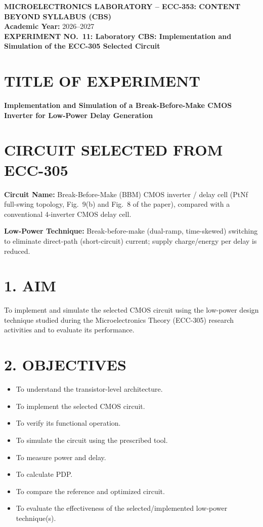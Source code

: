 \documentclass[11pt,a4paper]{article}
\newcommand{\sect}[1]{\section*{#1}}
\begin{document}
\collegeheader

\begin{center}
  {\bfseries MICROELECTRONICS LABORATORY -- ECC-353: CONTENT BEYOND SYLLABUS (CBS)}\\[3pt]
  \textbf{Academic Year:} 2026--2027\\[6pt]
  {\bfseries EXPERIMENT NO.\ 11: Laboratory CBS: Implementation and Simulation of the ECC-305 Selected Circuit}
\end{center}

\studentdetails
\evaluatorbox

\vspace{4pt}
\section*{\centering TITLE OF EXPERIMENT}
\begin{center}\textbf{Implementation and Simulation of a Break-Before-Make CMOS Inverter for Low-Power Delay Generation}\end{center}

\section*{\centering CIRCUIT SELECTED FROM ECC-305}
\textbf{Circuit Name:} Break-Before-Make (BBM) CMOS inverter / delay cell (PtNf full-swing topology, Fig.~9(b) and Fig.~8 of the paper), compared with a conventional 4-inverter CMOS delay cell.

\textbf{Low-Power Technique:} Break-before-make (dual-ramp, time-skewed) switching to eliminate direct-path (short-circuit) current; supply charge/energy per delay is reduced.

\newpage
\sect{1. AIM}
To implement and simulate the selected CMOS circuit using the low-power design technique studied during the Microelectronics Theory (ECC-305) research activities and to evaluate its performance.

\sect{2. OBJECTIVES}
\begin{itemize}
  \item To understand the transistor-level architecture.
  \item To implement the selected CMOS circuit.
  \item To verify its functional operation.
  \item To simulate the circuit using the prescribed tool.
  \item To measure power and delay.
  \item To calculate PDP.
  \item To compare the reference and optimized circuit.
  \item To evaluate the effectiveness of the selected/implemented low-power technique(s).
\end{itemize}
\end{document}

